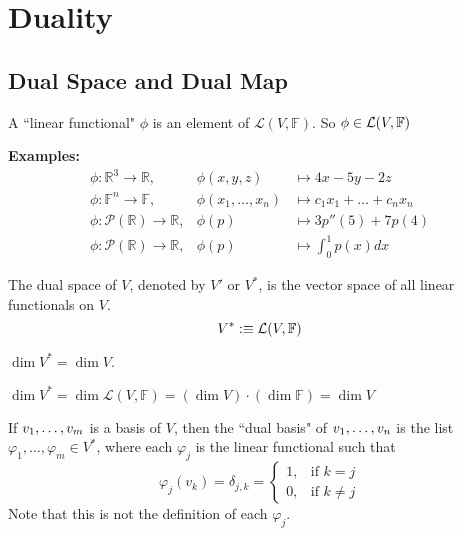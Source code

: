 
\section{Duality}
\subsection{Dual Space and Dual Map}

\setcounter{thm}{107}
\begin{mydef}
  A ``linear functional" $\phi$ is an element of $\mathcal{L}(V, \mathbb{F})$. So $\phi \in \mathcal{L}(V, \mathbb{F})$
\end{mydef}

\textbf{Examples:}
\begin{equation}
  \begin{array}{lll}
    \phi: \mathbb{R}^3  \to \mathbb{R}, &\phi (x,y,z)  & \mapsto 4x-5y-2z \\
    \phi: \mathbb{F}^n  \to \mathbb{F}, &\phi (x_1, \dots, x_n)
    & \mapsto c_1x_1 + \dots + c_nx_n  \\
    \phi: \mathcal{P} (\mathbb{R})  \to \mathbb{R},
    & \phi(p) & \mapsto 3p''(5) + 7p(4) \\
    \phi: \mathcal{P}(\mathbb{R}) \to \mathbb{R},
    & \phi(p)  &\mapsto \textstyle \int_{0}^{1} p(x) dx
  \end{array}
\end{equation}

\setcounter{thm}{109}
\begin{thm}
  The dual space of $V$, denoted by $V'$ or $V^{*}$, is the vector space of all linear functionals on $V$.
  \begin{equation}
    V^{*} :\equiv \mathcal{L}(V, \mathbb{F})
  \end{equation}
\end{thm}

\begin{thm}
  $\dim V^{*} = \dim V$.
\end{thm}
\begin{prf}
  $\dim V^{*} = \dim \mathcal{L}(V, \mathbb{F})=(\dim V) \cdot (\dim \mathbb{F}) = \dim V $
  
\end{prf}


\begin{mydef}
  If $v_1, \dots, v_m$ is a basis of $V$, then the ``dual basis" of $v_1, \dots, v_n$ is the list $\varphi_1, \dots, \varphi_m \in V^{*}$, where each $\varphi_j$ is the linear functional such that
  \begin{equation}
    \varphi_j(v_k) = \delta_{j,k} =
  \begin{cases}
    1,  & \text{if $k=j$} \\
    0, & \text{if $k \neq j$}
  \end{cases}
  \end{equation}
  Note that this is not the definition of each $\varphi_j$.
\end{mydef}


